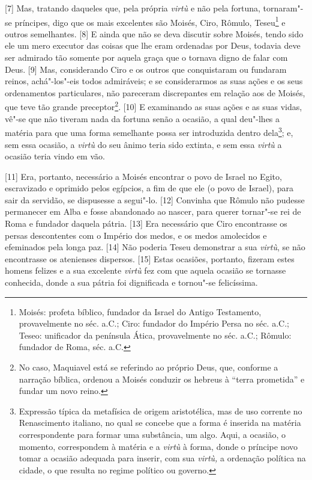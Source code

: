 {[}7{]} Mas, tratando daqueles que, pela própria \emph{virtù} e não pela
fortuna, tornaram"-se príncipes, digo que os mais excelentes são Moisés,
Ciro, Rômulo, Teseu\footnote{Moisés: profeta bíblico, fundador da Israel
  do Antigo Testamento, provavelmente no séc.  a.C.; Ciro: fundador
  do Império Persa no séc.  a.C.; Teseo: unificador da península
  Ática, provavelmente no séc.  a.C.; Rômulo: fundador de Roma,
  séc. a.C.} e outros semelhantes. {[}8{]} E ainda que não se deva
discutir sobre Moisés, tendo sido ele um mero executor das coisas que
lhe eram ordenadas por Deus, todavia deve ser admirado tão somente por
aquela graça que o tornava digno de falar com Deus. {[}9{]} Mas,
considerando Ciro e os outros que conquistaram ou fundaram reinos,
achá"-los"-eis todos admiráveis; e se considerarmos as suas ações e os
seus ordenamentos particulares, não pareceram discrepantes em relação
aos de Moisés, que teve tão grande preceptor\footnote{No caso, Maquiavel
  está se referindo ao próprio Deus, que, conforme a narração bíblica,
  ordenou a Moisés conduzir os hebreus à ``terra prometida'' e fundar um
  novo reino.}. {[}10{]} E examinando as suas ações e as suas vidas,
vê"-se que não tiveram nada da fortuna senão a ocasião, a qual deu"-lhes a
matéria para que uma forma semelhante possa ser introduzida dentro
dela\footnote{Expressão típica da metafísica de origem aristotélica, mas
  de uso corrente no Renascimento italiano, no qual se concebe que a
  forma é inserida na matéria correspondente para formar uma substância,
  um algo. Aqui, a ocasião, o momento, correspondem à matéria e a
  \emph{virtù} à forma, donde o príncipe novo tomar a ocasião adequada
  para inserir, com sua \emph{virtù,} a ordenação política na cidade, o
  que resulta no regime político ou governo.}; e, sem essa ocasião, a
\emph{virtù} do seu ânimo teria sido extinta, e sem essa \emph{virtù} a
ocasião teria vindo em vão.

{[}11{]} Era, portanto, necessário a Moisés encontrar o povo de Israel
no Egito, escravizado e oprimido pelos egípcios, a fim de que ele (o
povo de Israel), para sair da servidão, se dispusesse a segui"-lo.
{[}12{]} Convinha que Rômulo não pudesse permanecer em Alba e fosse
abandonado ao nascer, para querer tornar"-se rei de Roma e fundador
daquela pátria. {[}13{]} Era necessário que Ciro encontrasse os persas
descontentes com o Império dos medos, e os medos amolecidos e efeminados
pela longa paz. {[}14{]} Não poderia Teseu demonstrar a sua
\emph{virtù}, se não encontrasse os atenienses dispersos. {[}15{]} Estas
ocasiões, portanto, fizeram estes homens felizes e a sua excelente
\emph{virtù} fez com que aquela ocasião se tornasse conhecida, donde a
sua pátria foi dignificada e tornou"-se felicíssima.

